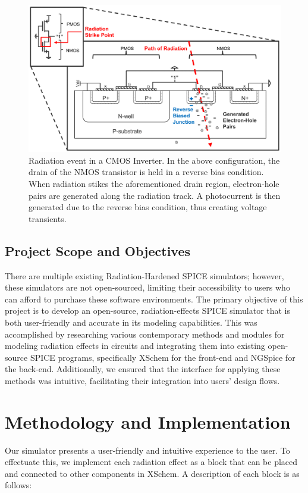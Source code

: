 \documentclass[conference]{IEEEtran}
\begin{document}
    \begin{figure}[htbp]
        \centering
        \includegraphics[width=1\linewidth]{Inverter_Image_B_W_cropped}
        \caption{Radiation event in a CMOS Inverter. In the above configuration, the drain of the NMOS transistor is held in a reverse bias condition. When radiation stikes the aforementioned drain region, electron-hole pairs are generated along the radiation track. A photocurrent is then generated due to the reverse bias condition, thus creating voltage transients.}
        \label{fig:cmos_inverter}
    \end{figure}
    

    \subsection{Project Scope and Objectives}\label{subsec:project-scope-and-objectives}
    There are multiple existing Radiation-Hardened SPICE simulators; however, these simulators are not open-sourced, limiting their accessibility to users who can afford to purchase these software environments.
    The primary objective of this project is to develop an open-source, radiation-effects SPICE simulator that is both user-friendly and accurate in its modeling capabilities.
    This was accomplished by researching various contemporary methods and modules for modeling radiation effects in circuits and integrating them into existing open-source SPICE programs, specifically XSchem for the front-end and NGSpice for the back-end.
    Additionally, we ensured that the interface for applying these methods was intuitive, facilitating their integration into users' design flows.


    \section{Methodology and Implementation}\label{sec:methodology-and-implementation}
    Our simulator presents a user-friendly and intuitive experience to the user.
    To effectuate this, we implement each radiation effect as a block that can be placed and connected to other components in XSchem.
    A description of each block is as follows:
\end{document}
